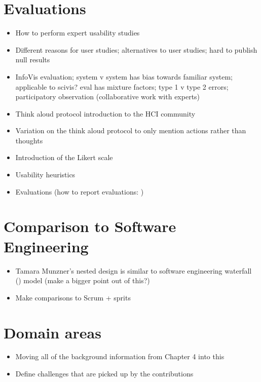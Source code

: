 \section{Evaluations}
\begin{itemize}
\begin{itemize}
    \item Many papers in InfoVis have been written about evaluations
    \item How are they applicable to scivis or vis in general
\end{itemize}
\item \cite{tory2005evaluating} How to perform expert usability studies
\item \cite{kosara2003thoughts} Different reasons for user studies; alternatives to user studies; hard to publish null results
\item \cite{carpendale2008evaluating} InfoVis evaluation; system v system has bias towards familiar system; applicable to scivis? eval has mixture factors; type 1 v type 2 errors; participatory observation (collaborative work with experts)
\item \cite{lewis1993task} Think aloud protocol introduction to the HCI community
\item \cite{ericsson1980verbal} Variation on the think aloud protocol to only mention actions rather than thoughts
\item \cite{likert1932technique} Introduction of the Likert scale
\item \cite{nielsen1994heuristic} Usability heuristics
\item Evaluations \cite{plaisant2004challenge} (how to report evaluations: \cite{forsell2012guide})
\end{itemize}

\section{Comparison to Software Engineering}
\begin{itemize}
\item Tamara Munzner's nested design is similar to software engineering waterfall (\cite{royce1970managing, victor2003iterative}) model (make a bigger point out of this?)
\item Make comparisons to Scrum + sprits
\end{itemize}

\section{Domain areas}
\label{app:domain}

\begin{itemize}
\item Moving all of the background information from Chapter 4 into this
\item Define challenges that are picked up by the contributions
\end{itemize}
